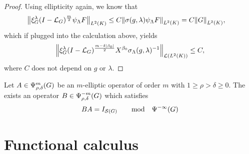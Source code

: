 \begin{proof}
    Using ellipticity again,
    we know that
    \begin{align*}
        \norm [\Lebesgue 2 \CompactGroup] {\Rep \lambda \BesselPotential {m} \psi_\Lambda F}
        &\leq C \norm [\Lebesgue 2 \CompactGroup] {\sigma(g, \lambda) \psi_\Lambda F} = C \norm [\Lebesgue 2 \CompactGroup] {G},
    \end{align*}
    which if plugged into the calculation above,
    yields
    \begin{align*}
        \norm [\Lin {\Lebesgue 2 \CompactGroup}] {%
            \Rep \lambda \BesselPotential {m - \delta \abs {\beta_0}}
            \LeftDifferentialOperator {\beta_0} \sigma_\Lambda(g, \lambda)^{-1}
        } \leq C,
    \end{align*}
    where $C$ does not depend on $g$ or $\lambda$.
\end{proof}

\begin{theorem}
    Let $A \in \OperatorClass m {\rho, \delta}$ be an $m$-elliptic operator of order $m$ with $1 \geq \rho > \delta \geq 0$.
    The exists an operator $B \in \OperatorClass {-m} {\rho, \delta}$ which satisfies
    \begin{align*}
        B A = \Id {\Schwartz \Group} \qquad \text{mod} \quad \SmoothingOperators
    \end{align*}
\end{theorem}

\section{Functional calculus}
